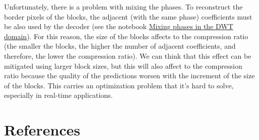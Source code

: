 Unfortunately, there is a problem with mixing the phases. To
reconstruct the border pixels of the blocks, the adjacent (with the
same phase) coefficients must be also used by the decoder (see the
notebook
\href{https://github.com/vicente-gonzalez-ruiz/motion_compensation_dwt_domain/blob/main/mixing_phases.ipynb}{Mixing
  phases in the DWT domain}). For this reason, the size of the blocks
affects to the compression ratio (the smaller the blocks, the higher
the number of adjacent coefficients, and therefore, the lower the
compression ratio). We can think that this effect can be mitigated
using larger block sizes, but this will also affect to the compression
ratio because the quality of the predictions worsen with the increment
of the size of the blocks. This carries an optimization problem that
it's hard to solve, especially in real-time applications.


\section{References}

\renewcommand{\addcontentsline}[3]{}%



\begin{comment}
\begin{figure}
  \centering
  \begin{tabular}{ccc}
    \vbox{\png{moving_circle_000}{400}} & %
    \vbox{\svg{movement_0}{400}} &
    \vbox{\png{difference_0}{400}} \\
    \vbox{\svg{haar_LL}{400}} & %
    \vbox{\svg{db5_LL}{400}} &
    \vbox{\svg{bior35_LL}{400}} \\
    \vbox{\myfig{haar_LH}{4cm}{400}} &
    \vbox{\myfig{db5_LH}{4cm}{400}} &
    \vbox{\myfig{bior35_LH}{4cm}{400}} \\ 
    \vbox{\myfig{haar_HL}{4cm}{400}} &
    \vbox{\myfig{db5_HL}{4cm}{400}} &
    \vbox{\myfig{bior35_HL}{4cm}{400}} \\
    \vbox{\myfig{haar_HH}{4cm}{400}} &
    \vbox{\myfig{db5_HH}{4cm}{400}} &
    \vbox{\myfig{bior35_HH}{4cm}{400}} 
  \end{tabular}
  \caption{A demonstration of the shift-variance of the DWT.}
\end{figure}
\end{comment}  
